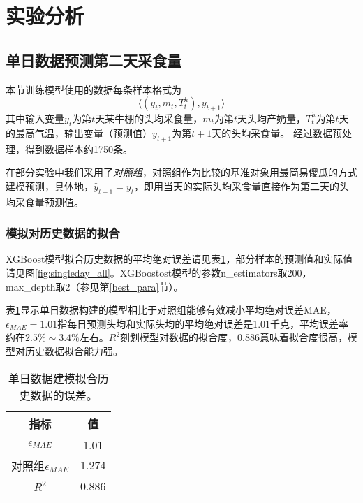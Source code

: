 \section{实验分析}
\label{evaluation}

\subsection{单日数据预测第二天采食量}

本节训练模型使用的数据每条样本格式为
\begin{equation}
\label{sample}
	\langle (y_t, m_t, T^h_t), y_{t+1} \rangle
\end{equation}
	其中输入变量$y_t$为第$t$天某牛棚的头均采食量，$m_t$为第$t$天头均产奶量，$T_t^h$为第$t$天的最高气温，输出变量（预测值）$y_{t+1}$为第$t+1$天的头均采食量。
经过数据预处理，得到数据样本约1750条。
	
在部分实验中我们采用了\emph{对照组}，对照组作为比较的基准对象用最简易傻瓜的方式建模预测，具体地，$\hat y_{t+1} = y_t$，即用当天的实际头均采食量直接作为第二天的头均采食量预测值。

	
\subsubsection{模拟对历史数据的拟合}

XGBoost模型拟合历史数据的平均绝对误差请见表\ref{tab:singleday_all}，部分样本的预测值和实际值请见图\ref{fig:singleday_all}。XGBoostost模型的参数n\_estimators取200，max\_depth取2（参见第\ref{best_para}节）。

表\ref{tab:singleday_all}显示单日数据构建的模型相比于对照组能够有效减小平均绝对误差MAE，$\epsilon_{MAE}=1.01$指每日预测头均和实际头均的平均绝对误差是1.01千克，平均误差率约在$2.5\%\sim3.4\%$左右。$R^2$刻划模型对数据的拟合度，0.886意味着拟合度很高，模型对历史数据拟合能力强。

\begin{table}
\caption{单日数据建模拟合历史数据的误差。}
\begin{center}
\footnotesize
\begin{tabular}{|c|c|}
\hline
	指标 & 值\\
\hline
	$\epsilon_{MAE}$  &  1.01\\
	对照组$\epsilon_{MAE}$ & 1.274 \\
	$R^2$  &  0.886 \\
\hline
\end{tabular}
\end{center}
\label{tab:singleday_all}
\end{table}

